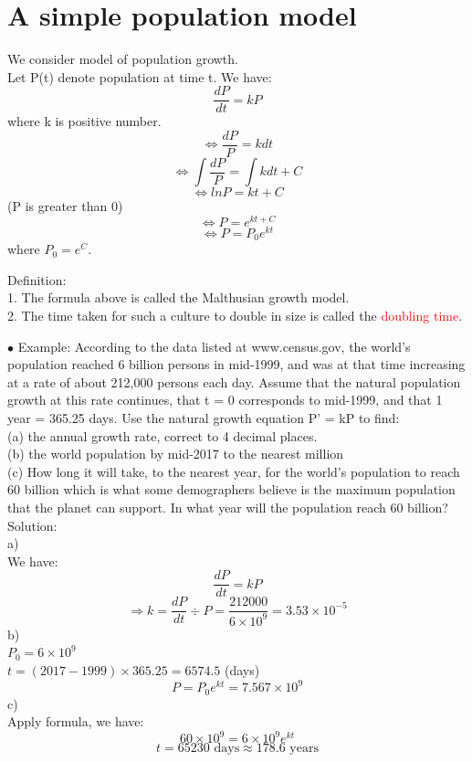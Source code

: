 \documentclass[12pt]{article}
\begin{document}
\section{A simple population model}
We consider model of population growth. 
\\
Let P(t) denote population at time t. We have: 
$$\frac{dP}{dt} = kP$$
where k is positive number.\\
$$\Leftrightarrow \frac{dP}{P}=kdt$$
$$\Leftrightarrow \displaystyle \int \frac{dP}{P}= \displaystyle \int kdt + C$$
$$\Leftrightarrow lnP = kt +C$$
(P is greater than 0) \\
$$\Leftrightarrow P = e^{kt +C}$$
$$\Leftrightarrow P = P_0e^{kt}$$
where $P_0 = e^C$. 
\\
\begin{mybox}
    Definition: \\
    1. The formula above is called the Malthusian growth model.\\
    2. The time taken for such a culture to double in size is called the
\textcolor{red}{doubling time}.
\end{mybox}

$\bullet$ Example: According to the data listed at www.census.gov, the world’s population reached 6 billion persons in mid-1999, and was at that time increasing at a rate of about 212,000 persons each day. Assume that the natural population growth at this rate continues, that t = 0 corresponds to mid-1999, and that 1 year = 365.25 days. Use the natural growth equation P’ = kP to find:\\
(a) the annual growth rate, correct to 4 decimal places.\\
(b) the world population by mid-2017 to the nearest million\\
(c) How long it will take, to the nearest year, for the world’s population to reach 60 billion which is what some demographers believe is the maximum population that the planet can support. In what year will the population reach 60 billion?\\
Solution: \\

a)\\
We have: \\
$$\frac{dP}{dt}= kP$$ $$\Rightarrow k = \frac{dP}{dt} \div P = \frac{212000}{6 \times 10^9} = 3.53 \times10^{-5}$$
b)\\
$P_0=6\times 10^9$\\
$t = (2017 -1999) \times 365.25 = 6574.5$ (days)
\\
$$P = P_0e^{kt} = 7.567 \times 10^9$$
c) \\
Apply formula, we have: \\
$$60 \times 10^9 = 6 \times 10^9 e^{kt}$$
$$ t = 65230  \text{ days} \approx 178.6 \text{ years} $$
\end{document}
